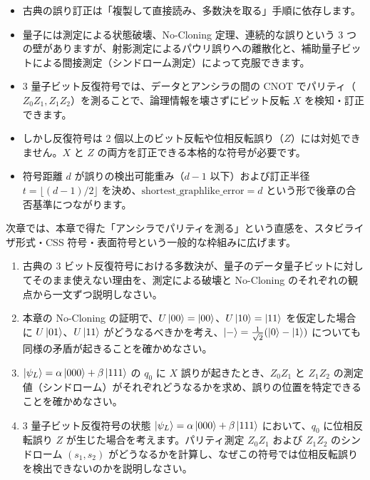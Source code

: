 \begin{itemize}
  \item 古典の誤り訂正は「複製して直接読み、多数決を取る」手順に依存します。
  \item 量子には測定による状態破壊、No-Cloning 定理、連続的な誤りという 3 つの壁がありますが、射影測定によるパウリ誤りへの離散化と、補助量子ビットによる間接測定（シンドローム測定）によって克服できます。
  \item 3 量子ビット反復符号では、データとアンシラの間の CNOT でパリティ（$Z_0Z_1, Z_1Z_2$）を測ることで、論理情報を壊さずにビット反転 $X$ を検知・訂正できます。
  \item しかし反復符号は 2 個以上のビット反転や位相反転誤り（$Z$）には対処できません。$X$ と $Z$ の両方を訂正できる本格的な符号が必要です。
  \item 符号距離 $d$ が誤りの検出可能重み（$d-1$ 以下）および訂正半径 $t = \lfloor (d-1)/2 \rfloor$ を決め、$\mathrm{shortest\_graphlike\_error}=d$ という形で後章の合否基準につながります。
\end{itemize}

次章では、本章で得た「アンシラでパリティを測る」という直感を、スタビライザ形式・CSS 符号・表面符号という一般的な枠組みに広げます。

\begin{exercise}
  \begin{enumerate}
    \item 古典の 3 ビット反復符号における多数決が、量子のデータ量子ビットに対してそのまま使えない理由を、測定による破壊と No-Cloning のそれぞれの観点から一文ずつ説明しなさい。
    \item 本章の No-Cloning の証明で、$U\ket{00}=\ket{00}$、$U\ket{10}=\ket{11}$ を仮定した場合に $U\ket{01}$、$U\ket{11}$ がどうなるべきかを考え、$\ket{-}=\frac{1}{\sqrt2}(\ket0-\ket1)$ についても同様の矛盾が起きることを確かめなさい。
    \item $\ket{\psi_L}=\alpha\ket{000}+\beta\ket{111}$ の $q_0$ に $X$ 誤りが起きたとき、$Z_0Z_1$ と $Z_1Z_2$ の測定値（シンドローム）がそれぞれどうなるかを求め、誤りの位置を特定できることを確かめなさい。
    \item 3 量子ビット反復符号の状態 $\ket{\psi_L}=\alpha\ket{000}+\beta\ket{111}$ において、$q_0$ に位相反転誤り $Z$ が生じた場合を考えます。パリティ測定 $Z_0Z_1$ および $Z_1Z_2$ のシンドローム $(s_1, s_2)$ がどうなるかを計算し、なぜこの符号では位相反転誤りを検出できないのかを説明しなさい。
  \end{enumerate}
\end{exercise}
